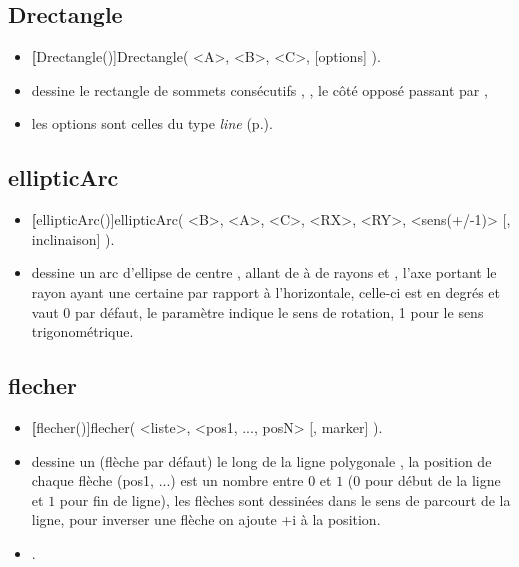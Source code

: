 \subsection{Drectangle}

\begin{itemize}
 \item \util \textbf[Drectangle()]{Drectangle( <A>, <B>, <C>, [options] )}.
 \item \desc dessine le rectangle de sommets consécutifs , , le côté opposé passant par ,
 \item les options sont celles du type \emph{line} (p.\pageref{typeline}).
\end{itemize} 


\subsection{ellipticArc}\label{macellipticArc}
\begin{itemize}
 \item \util \textbf[ellipticArc()]{ellipticArc( <B>, <A>, <C>, <RX>, <RY>, <sens(+/-1)> [, inclinaison] )}.
 \item \desc dessine un arc d'ellipse de centre , allant de  à  de rayons  et , l'axe portant le rayon  ayant une certaine  par rapport à l'horizontale, celle-ci est en degrés et vaut 0 par défaut, le paramètre  indique le sens de rotation, 1 pour le sens trigonométrique.
\end{itemize}


\subsection{flecher}

\begin{itemize}
 \item \util \textbf[flecher()]{flecher( <liste>, <pos1, ..., posN> [, marker] )}.
 \item \desc dessine un  (flèche par défaut) le long de la ligne polygonale , la position de chaque flèche (pos1, ...) est un nombre entre $0$ et $1$ ($0$ pour début de la ligne et $1$ pour fin de ligne), les flèches sont dessinées dans le sens de parcourt de la ligne, pour inverser une flèche on ajoute +i à la position.
 \item \exem {}.
\end{itemize}

